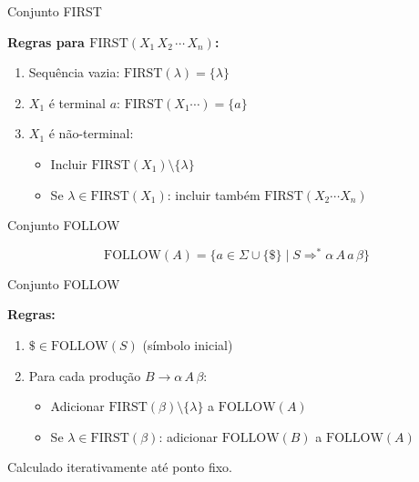 \begin{frame}{Conjunto FIRST}

    \textbf{Regras para \(\mathrm{FIRST}(X_1\, X_2\, \cdots\, X_n)\):}

    \begin{enumerate}

        \item
        Sequência vazia: \(\mathrm{FIRST}(\lambda) = \{\lambda\}\)
        \item
        \(X_1\) é terminal \(a\): \(\mathrm{FIRST}(X_1\cdots) = \{a\}\)
        \item
        \(X_1\) é não-terminal:

        \begin{itemize}

            \item
            Incluir \(\mathrm{FIRST}(X_1) \setminus \{\lambda\}\)
            \item
            Se \(\lambda \in \mathrm{FIRST}(X_1)\): incluir também
            \(\mathrm{FIRST}(X_2\cdots X_n)\)
        \end{itemize}
    \end{enumerate}
\end{frame}

\begin{frame}{Conjunto FOLLOW}

    \[\mathrm{FOLLOW}(A) = \{a \in \Sigma \cup \{\$\} \mid S \Rightarrow^* \alpha\,A\,a\,\beta\}\]
\end{frame}

\begin{frame}{Conjunto FOLLOW}

    \textbf{Regras:}

    \begin{enumerate}

        \item
        \(\$ \in \mathrm{FOLLOW}(S)\) (símbolo inicial)
        \item
        Para cada produção \(B \to \alpha\,A\,\beta\):

        \begin{itemize}

            \item
            Adicionar \(\mathrm{FIRST}(\beta) \setminus \{\lambda\}\) a
            \(\mathrm{FOLLOW}(A)\)
            \item
            Se \(\lambda \in \mathrm{FIRST}(\beta)\): adicionar
            \(\mathrm{FOLLOW}(B)\) a \(\mathrm{FOLLOW}(A)\)
        \end{itemize}
    \end{enumerate}

    Calculado iterativamente até ponto fixo.
\end{frame}

